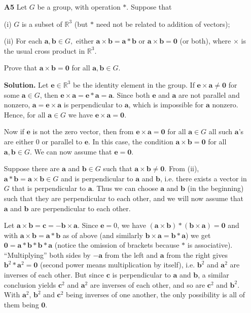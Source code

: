 \documentclass[11pt,a4paper]{article}
\newcommand{\bbR}{\mathbb R}
\newcommand{\<}{\langle}
\renewcommand{\>}{\rangle}
\begin{document}
\begin{enumerate}
	\item [\textbf{A5}]
	Let $G$ be a group, with operation $*$. Suppose that
	
	(i) $G$ is a subset of $\mathbb{R}^3$ (but $*$ need not be related to addition of vectors);
	
	(ii) For each $\mathbf{a},\mathbf{b}\in G,$ either $\mathbf{a}\times\mathbf{b}=\mathbf{a}*\mathbf{b}$ or $\mathbf{a}\times\mathbf{b}=\mathbf{0}$ (or both), where $\times$ is the usual cross product in $\mathbb{R}^3.$
	
	Prove that $\mathbf{a}\times\mathbf{b}=\mathbf{0}$ for all $\mathbf{a},\mathbf{b}\in G.$
	
	\textbf{Solution.} Let $\mathbf{e}\in\bbR^3$ be the identity element in the group. If $\mathbf{e}\times\mathbf{a}\neq\mathbf{0}$ for some $\mathbf{a}\in G$, then $\mathbf{e}\times\mathbf{a}=\mathbf{e} * \mathbf{a}=\mathbf{a}$. Since both $\mathbf{e}$ and $\mathbf{a}$ are not parallel and nonzero, $\mathbf{a}=\mathbf{e}\times\mathbf{a}$ is perpendicular to $\mathbf{a}$, which is impossible for $\mathbf{a}$ nonzero. 
	Hence, for all $\mathbf{a}\in G$ we have $\mathbf{e}\times\mathbf{a}=\mathbf{0}$. 
	
	Now if $\mathbf{e}$ is not the zero vector, then from $\mathbf{e}\times\mathbf{a}=\mathbf{0}$ for all $\mathbf{a}\in G$ all such $\mathbf{a}$'s are either 0 or parallel to $\mathbf{e}$. In this case, the condition $\mathbf{a}\times\mathbf{b}=\mathbf{0}$ for all $\mathbf{a},\mathbf{b}\in G.$ We can now assume that $\mathbf{e}=\mathbf{0}$. 
	
	Suppose there are $\mathbf{a}$ and $\mathbf{b}\in G$ such that $\mathbf{a}\times\mathbf{b}\neq \mathbf{0}$. From (ii), $\mathbf{a}*\mathbf{b}=\mathbf{a}\times\mathbf{b}\in G$ and is perpendicular to $\mathbf{a}$ and $\mathbf{b}$, i.e. there exists a vector in $G$ that is perpendicular to $\mathbf{a}$. Thus we can choose $\mathbf{a}$ and $\mathbf{b}$ (in the beginning) such that they are perpendicular to each other, and we will now assume that $\mathbf{a}$ and $\mathbf{b}$ are perpendicular to each other. 
	
	Let $\mathbf{a}\times \mathbf{b}=\mathbf{c}=-\mathbf{b}\times\mathbf{a}$. Since $\mathbf{e}=0$, we have $(\mathbf{a}\times \mathbf{b}) * (\mathbf{b}\times\mathbf{a}) =\mathbf{0}$ and with $\mathbf{a}\times\mathbf{b}=\mathbf{a}*\mathbf{b}$ as of above (and similarly $\mathbf{b}\times\mathbf{a}=\mathbf{b}*\mathbf{a}$) we get 
	$\mathbf{0}=\mathbf{a}*\mathbf{b}*\mathbf{b}*\mathbf{a}$ (notice the omission of brackets because $*$ is associative). 
	``Multiplying'' both sides by $-\mathbf{a}$ from the left and $\mathbf{a}$ from the right gives $\mathbf{b}^2 * \mathbf{a}^2=\mathbf{0}$ (second power means multiplication by itself), i.e. $\mathbf{b}^2$ and $\mathbf{a}^2$ are inverses of each other. But since $\mathbf{c}$ is perpendicular to $\mathbf{a}$ and $\mathbf{b}$, a similar conclusion yields $\mathbf{c}^2$ and $\mathbf{a}^2$ are inverses of each other, and so are $\mathbf{c}^2$ and $\mathbf{b}^2$. With $\mathbf{a}^2$, $\mathbf{b}^2$ and $\mathbf{c}^2$ being inverses of one another, the only possibility is all of them being $\mathbf{0}$. 
	

\end{enumerate}
\end{document}
